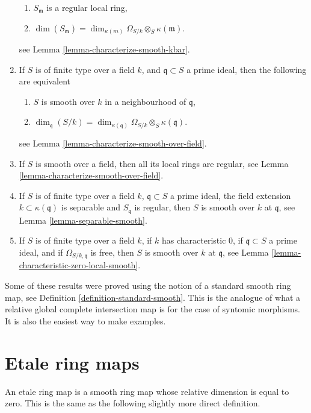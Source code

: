 \begin{enumerate}
\begin{enumerate}
\item $S_{\mathfrak m}$ is a regular local ring,
\item $\dim(S_{\mathfrak m}) =
\dim_{\kappa(m)} \Omega_{S/k} \otimes_S \kappa(\mathfrak m)$.
\end{enumerate}
see Lemma \ref{lemma-characterize-smooth-kbar}.
\item If $S$ is of finite type over a field $k$, and
$\mathfrak q \subset S$ a prime ideal,
then the following are equivalent
\begin{enumerate}
\item $S$ is smooth over $k$ in a neighbourhood of $\mathfrak q$,
\item $\dim_{\mathfrak q}(S/k) =
\dim_{\kappa(\mathfrak q)} \Omega_{S/k} \otimes_S \kappa(\mathfrak q)$.
\end{enumerate}
see Lemma \ref{lemma-characterize-smooth-over-field}.
\item If $S$ is smooth over a field, then all its local rings are
regular, see Lemma \ref{lemma-characterize-smooth-over-field}.
\item If $S$ is of finite type over a field $k$,
$\mathfrak q \subset S$ a prime ideal,
the field extension $k \subset \kappa(\mathfrak q)$ is separable
and $S_{\mathfrak q}$ is regular, then $S$ is smooth over $k$ at
$\mathfrak q$, see Lemma \ref{lemma-separable-smooth}.
\item If $S$ is of finite type over a field $k$,
if $k$ has characteristic $0$, if
$\mathfrak q \subset S$ a prime ideal, and if
$\Omega_{S/k, \mathfrak q}$ is free, then $S$ is smooth over $k$ at
$\mathfrak q$, see Lemma \ref{lemma-characteristic-zero-local-smooth}.
\end{enumerate}
Some of these results were proved using the notion of a standard
smooth ring map, see Definition \ref{definition-standard-smooth}.
This is the analogue of what a relative global
complete intersection map is for the case of syntomic morphisms.
It is also the easiest way to make examples.













\section{Etale ring maps}
\label{section-etale}

\noindent
An etale ring map is a smooth ring map whose relative dimension
is equal to zero. This is the same as the following slightly more
direct definition.

